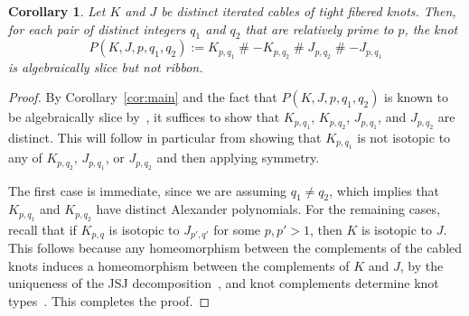 \documentclass[11pt, reqno]{amsart}
\newtheorem{corollary}[theorem]{Corollary}
\theoremstyle{definition}
\theoremstyle{remark}
\numberwithin{equation}{section}
\begin{document}
\setcounter{corollary}{1}
\renewcommand{\thecorollary}{1.3}
\begin{corollary}\label{cor:examplesbody}
Let $K$ and $J$ be distinct iterated cables of tight fibered knots. Then, for each pair of distinct integers $q_1$ and $q_2$ that are relatively prime to $p$, the knot
\[
P(K, J, p, q_1, q_2) := K_{p,q_1} \mathbin{\#} -K_{p,q_2} \mathbin{\#} J_{p,q_2} \mathbin{\#} -J_{p,q_1}
\]
is algebraically slice but not ribbon.
\end{corollary}
\renewcommand{\thecorollary}{\thesection.\arabic{corollary}}

\begin{proof}
By Corollary~\ref{cor:main} and the fact that $P(K, J, p, q_1, q_2)$ is known to be algebraically slice by~\cite{Livingston-Melvin:1983}, it suffices to show that $K_{p,q_1}$, $K_{p,q_2}$, $J_{p,q_1}$, and $J_{p,q_2}$ are distinct. This will follow in particular from showing that $K_{p,q_1}$ is not isotopic to any of $K_{p,q_2}$, $J_{p,q_1}$, or $J_{p,q_2}$ and then applying symmetry.


The first case is immediate, since we are assuming $q_1 \neq q_2$, which implies that $K_{p,q_1}$ and $K_{p,q_2}$ have distinct Alexander polynomials.   For the remaining cases, recall that if $K_{p,q}$ is isotopic to $J_{p',q'}$ for some $p, p' > 1$, then $K$ is isotopic to $J$. This follows because any homeomorphism between the complements of the cabled knots induces a homeomorphism between the complements of $K$ and $J$, by the uniqueness of the JSJ decomposition~\cite{Jaco-Shalen:1979, Johannson:1979}, and knot complements determine knot types~\cite{Gordon-Luecke:1989}.   This completes the proof.
\end{proof}
\end{document}
